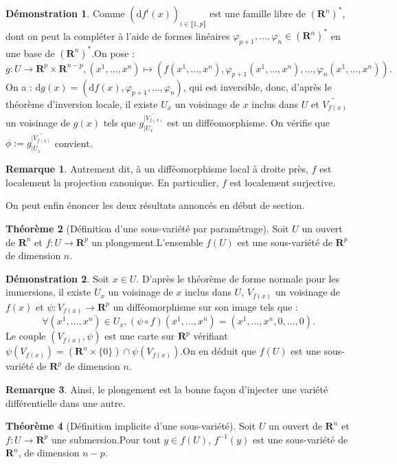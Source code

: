 \documentclass[12pt,a4paper]{article}
\theoremstyle{definition}
\newtheorem{thm}{Théorème}
\newtheorem{rqe}[thm]{Remarque}
\newtheorem*{dem}{Démonstration}
\begin{document}
\begin{dem}
Comme $(\mathrm{d}f^i(x))_{i\in\llbracket 1,p\rrbracket}$ est une famille libre de $(\mathbf{R}^n)^*$, dont on peut la compléter à l'aide de formes linéaires $\varphi_{p+1},\ldots,\varphi_{n}\in(\mathbf{R}^n)^*$ en une base de $(\mathbf{R}^n)^*$.\newline On pose :$$g:U\to\mathbf{R}^p\times\mathbf{R}^{n-p},(x^1,\ldots,x^n)\mapsto (f(x^1,\ldots,x^n),\varphi_{p+1}(x^1,\ldots,x^n),\ldots,\varphi_n(x^1,\ldots,x^n)).$$
On a : $\mathrm{d}g(x)=(\mathrm{d}f(x),\varphi_{p+1},\ldots,\varphi_n)$, qui est inversible, donc, d'après le théorème d'inversion locale, il existe $U_x$ un voisinage de $x$ inclus dans $U$ et $\widetilde{V_{f(x)}}$ un voisinage de $g(x)$ tels que $g_{|U_x}^{|\widetilde{V_{f(x)}}}$ est un difféomorphisme. On vérifie que $\phi:=g_{|U_x}^{|\widetilde{V_{f(x)}}}$ convient.
\end{dem}
\begin{rqe}
Autrement dit, à un difféomorphisme local à droite près, $f$ est localement la projection canonique. En particulier, $f$ est localement surjective.
\end{rqe}
On peut enfin énoncer les deux résultats annoncés en début de section.
\begin{thm}[Définition d'une sous-variété par paramétrage]
Soit $U$ un ouvert de $\mathbf{R}^n$ et $f:U\to\mathbf{R}^p$ un plongement.\newline L'ensemble $f(U)$ est une sous-variété de $\mathbf{R}^p$ de dimension $n$.
\end{thm}
\begin{dem}
Soit $x\in U$. D'après le théorème de forme normale pour les immersions, il existe $U_x$ un voisinage de $x$ inclus dans $U$, $V_{f(x)}$ un voisinage de $f(x)$ et $\psi:V_{f(x)}\to\mathbf{R}^p$ un difféomorphisme sur son image tels que :
$$\forall (x^1,\ldots,x^n)\in U_x, (\psi\circ f)(x^1,\ldots,x^n)=(x^1,\ldots,x^n,0,\ldots,0).$$
Le couple $(V_{f(x)},\psi)$ est une carte sur $\mathbf{R}^p$ vérifiant $\psi(V_{f(x)})=(\mathbf{R}^n\times\{0\})\cap\psi(V_{f(x)})$.\newline On en déduit que $f(U)$ est une sous-variété de $\mathbf{R}^p$ de dimension $n$.
\end{dem}
\begin{rqe}
Ainsi, le plongement est la bonne façon d'injecter une variété différentielle dans une autre.
\end{rqe}
\newpage
\begin{thm}[Définition implicite d'une sous-variété]
Soit $U$ un ouvert de $\mathbf{R}^n$ et $f:U\to\mathbf{R}^p$ une submersion.\newline Pour tout $y\in f(U)$, $f^{-1}(y)$ est une sous-variété de $\mathbf{R}^n$, de dimension $n-p$.
\end{thm}
\end{document}
